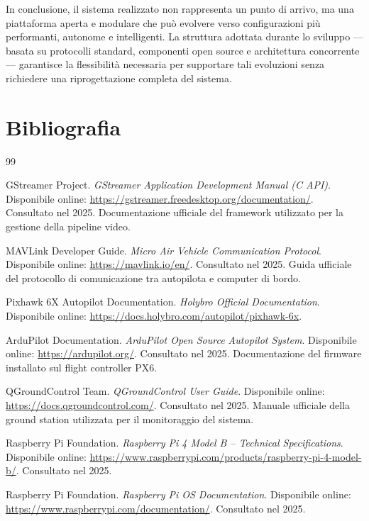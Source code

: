 In conclusione, il sistema realizzato non rappresenta un punto di arrivo,
ma una piattaforma aperta e modulare che può evolvere verso configurazioni
più performanti, autonome e intelligenti. La struttura adottata durante
lo sviluppo — basata su protocolli standard, componenti open source e
architettura concorrente — garantisce la flessibilità necessaria per
supportare tali evoluzioni senza richiedere una riprogettazione completa
del sistema.

\chapter{Bibliografia}
\label{cap:bibliografia}

\begin{thebibliography}{99}

GStreamer Project.  
\textit{GStreamer Application Development Manual (C API)}.  
Disponibile online: \url{https://gstreamer.freedesktop.org/documentation/}.  
Consultato nel 2025.  
Documentazione ufficiale del framework utilizzato per la gestione della pipeline video.

MAVLink Developer Guide.  
\textit{Micro Air Vehicle Communication Protocol}.  
Disponibile online: \url{https://mavlink.io/en/}.  
Consultato nel 2025.  
Guida ufficiale del protocollo di comunicazione tra autopilota e computer di bordo.

Pixhawk 6X Autopilot Documentation.  
\textit{Holybro Official Documentation}.  
Disponibile online: \url{https://docs.holybro.com/autopilot/pixhawk-6x}.

ArduPilot Documentation.  
\textit{ArduPilot Open Source Autopilot System}.  
Disponibile online: \url{https://ardupilot.org/}.  
Consultato nel 2025.  
Documentazione del firmware installato sul flight controller PX6.

QGroundControl Team.  
\textit{QGroundControl User Guide}.  
Disponibile online: \url{https://docs.qgroundcontrol.com/}.  
Consultato nel 2025.  
Manuale ufficiale della ground station utilizzata per il monitoraggio del sistema.

Raspberry Pi Foundation.  
\textit{Raspberry Pi 4 Model B – Technical Specifications}.  
Disponibile online: \url{https://www.raspberrypi.com/products/raspberry-pi-4-model-b/}.  
Consultato nel 2025.

Raspberry Pi Foundation.  
\textit{Raspberry Pi OS Documentation}.  
Disponibile online: \url{https://www.raspberrypi.com/documentation/}.  
Consultato nel 2025.


\end{thebibliography}
